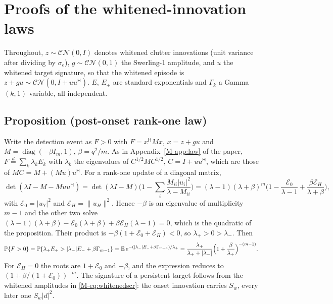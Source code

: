 \section{Proofs of the whitened-innovation laws}\label{sup:r12proofs}
Throughout, $z\sim\mathcal{CN}(0,I)$ denotes whitened clutter innovations (unit variance after dividing by $\sigma_e$), $g\sim\mathcal{CN}(0,1)$ the Swerling-1 amplitude, and $u$ the whitened target signature, so that the whitened episode is $z+gu\sim\mathcal{CN}(0,I+uu^{\mathsf H})$. $E$, $E_\pm$ are standard exponentials and $\Gamma_k$ a Gamma$(k,1)$ variable, all independent.

\subsection{Proposition (post-onset rank-one law)}
Write the detection event as $F>0$ with $F=x^{\mathsf H}Mx$, $x=z+gu$ and $M=\operatorname{diag}(-\beta I_m,1)$, $\beta=q^2/m$. As in Appendix~\ref{M-app:law} of the paper, $F\overset{d}{=}\sum_k\lambda_kE_k$ with $\lambda_k$ the eigenvalues of $C^{1/2}MC^{1/2}$, $C=I+uu^{\mathsf H}$, which are those of $MC=M+(Mu)u^{\mathsf H}$. For a rank-one update of a diagonal matrix,
\[
\det(\lambda I-M-Muu^{\mathsf H})=\det(\lambda I-M)\Big(1-\sum_i\frac{M_{ii}|u_i|^2}{\lambda-M_{ii}}\Big)=(\lambda-1)(\lambda+\beta)^m\Big(1-\frac{\mathcal E_0}{\lambda-1}+\frac{\beta \mathcal E_H}{\lambda+\beta}\Big),
\]
with $\mathcal E_0=|u_Y|^2$ and $\mathcal E_H=\|u_H\|^2$. Hence $-\beta$ is an eigenvalue of multiplicity $m-1$ and the other two solve $(\lambda-1)(\lambda+\beta)-\mathcal E_0(\lambda+\beta)+\beta\mathcal E_H(\lambda-1)=0$, which is the quadratic of the proposition. Their product is $-\beta(1+\mathcal E_0+\mathcal E_H)<0$, so $\lambda_+>0>\lambda_-$. Then
\[
\mathbb{P}\{F>0\}=\mathbb{P}\{\lambda_+E_+>|\lambda_-|E_-+\beta\Gamma_{m-1}\}=\mathbb E\,e^{-(|\lambda_-|E_-+\beta\Gamma_{m-1})/\lambda_+}=\frac{\lambda_+}{\lambda_++|\lambda_-|}\Big(1+\frac{\beta}{\lambda_+}\Big)^{-(m-1)}.
\]
For $\mathcal E_H=0$ the roots are $1+\mathcal E_0$ and $-\beta$, and the expression reduces to $(1+\beta/(1+\mathcal E_0))^{-m}$. The signature of a persistent target follows from the whitened amplitudes in \eqref{M-eq:whitenedscr}: the onset innovation carries $S_w$, every later one $S_w|d|^2$.

